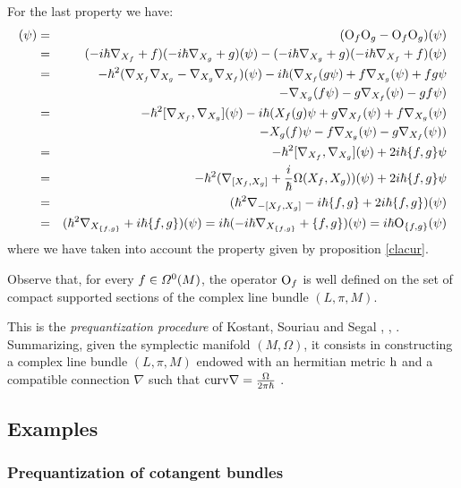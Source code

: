 \documentclass[12pt]{article}
\theoremstyle{plain}
\def\beann{\begin{eqnarray*}}
\def\eeann{\end{eqnarray*}}
\def\dst{\(}
\def\qed{\ifvmode\removelastskip\fi
{\unskip\nobreak\hfil\penalty50\hbox{}\nobreak\hfil
\hbox{\vrule height1.2ex width1.2ex}\parfillskip=0pt
\finalhyphendemerits=0 \par\smallskip}}
\def\Op{{\rm O}}
\def\h{{\rm h}}
\begin{document}
For the last property we have:
\beann
[\Op_f,\Op_g](\psi )
&=&
(\Op_f\Op_g - \Op_f\Op_g)(\psi )
\\
&=&
(-i\hbar \nabla_{X_f} + f)(-i\hbar\nabla_{X_g}+g)(\psi )
- (-i\hbar \nabla_{X_g} + g)(-i\hbar\nabla_{X_f}+f)(\psi )
\\ &=&
-\hbar^2 (\nabla_{X_f}\nabla_{X_g} - \nabla_{X_g}\nabla_{X_f})(\psi )
-i\hbar (\nabla_{X_f}(g\psi ) + f\nabla_{X_g}(\psi ) + fg\psi
\\ & &
- \nabla_{X_g}(f\psi ) - g\nabla_{X_f}(\psi ) -gf\psi )
\\ &=&
-\hbar^2 [\nabla_{X_f},\nabla_{X_g}](\psi )
-i\hbar (X_f(g)\psi + g\nabla_{X_f}(\psi ) + f\nabla_{X_g}(\psi )
\\ & &
- X_g(f)\psi - f\nabla_{X_g}(\psi ) - g\nabla_{X_f}(\psi ))
\\ &=&
-\hbar^2 [\nabla_{X_f},\nabla_{X_g}](\psi ) + 2i\hbar \{ f,g \}\psi
\\ &=&
 -\hbar^2 (\nabla_{[X_f,X_g]} +
 \frac{i}{\hbar}\Omega (X_f,X_g))(\psi ) +2i\hbar \{ f,g \}\psi
\\ &=&
(\hbar^2 \nabla_{-[X_f,X_g]} - i\hbar \{ f,g \} + 2i\hbar \{ f,g \}
)(\psi)
\\ &=&
(\hbar^2 \nabla_{X_{\{ f,g\} }} + i\hbar \{ f,g \} )(\psi) =
i\hbar(-i\hbar \nabla_{X_{\{ f,g\} }} + \{ f,g \} )(\psi) =
i\hbar\Op_{\{ f,g \}}(\psi )
\eeann
where we have taken into account the property given by proposition
\ref{clacur}.
\qed

Observe that, for every $f\in {\mit\Omega}^0(M)$,
the operator $\Op_f$ is well defined on the set
of compact supported sections of the complex line bundle
$(L,\pi , M)$.

This is the
{\it prequantization procedure} of Kostant, Souriau and Segal
\cite{Ko-70}, \cite{Se-60}, \cite{So-69}.
Summarizing, given the symplectic manifold
$(M,\Omega )$, it consists in constructing
a complex line bundle $(L,\pi ,M)$
endowed with an hermitian metric $\h$
and a compatible connection $\nabla$
such that \dst{\rm curv}\nabla = \frac{\Omega}{2\pi \hbar}\) .



\subsection{Examples}


\subsubsection{Prequantization of cotangent bundles}
\end{document}
